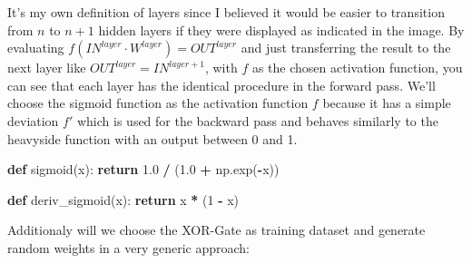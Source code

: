 \documentclass[
]{book}
\newenvironment{Shaded}{\begin{snugshade}}{\end{snugshade}}
\newcommand{\ControlFlowTok}[1]{\textcolor[rgb]{0.13,0.29,0.53}{\textbf{#1}}}
\newcommand{\DecValTok}[1]{\textcolor[rgb]{0.00,0.00,0.81}{#1}}
\newcommand{\FloatTok}[1]{\textcolor[rgb]{0.00,0.00,0.81}{#1}}
\newcommand{\KeywordTok}[1]{\textcolor[rgb]{0.13,0.29,0.53}{\textbf{#1}}}
\newcommand{\NormalTok}[1]{#1}
\newcommand{\OperatorTok}[1]{\textcolor[rgb]{0.81,0.36,0.00}{\textbf{#1}}}
\begin{document}
It's my own definition of layers since I believed it would be easier to transition from \(n\) to \(n+1\) hidden layers if they were displayed as indicated in the image. By evaluating \(f(IN^{layer} \cdot W^{layer}) = OUT^{layer}\) and just transferring the result to the next layer like \(OUT^{layer} = IN^{layer+1}\), with \(f\) as the chosen activation function, you can see that each layer has the identical procedure in the forward pass.
We'll choose the sigmoid function as the activation function \(f\) because it has a simple deviation \(f'\) which is used for the backward pass and behaves similarly to the heavyside function with an output between 0 and 1.

\begin{Shaded}
\begin{Highlighting}[]
\KeywordTok{def}\NormalTok{ sigmoid(x):}
  \ControlFlowTok{return} \FloatTok{1.0} \OperatorTok{/}\NormalTok{ (}\FloatTok{1.0} \OperatorTok{+}\NormalTok{ np.exp(}\OperatorTok{{-}}\NormalTok{x))}

\KeywordTok{def}\NormalTok{ deriv\_sigmoid(x):}
  \ControlFlowTok{return}\NormalTok{ x }\OperatorTok{*}\NormalTok{ (}\DecValTok{1} \OperatorTok{{-}}\NormalTok{ x)}
\end{Highlighting}
\end{Shaded}

Additionaly will we choose the XOR-Gate as training dataset and generate random weights in a very generic approach:
\end{document}
